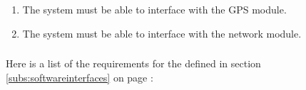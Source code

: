 \begin{enumerate} [resume*]

\item The system must be able to interface with the GPS module.

\item The system must be able to interface with the network module.



\end{enumerate} 


\subsubsection{} %
Here is a list of the requirements for the  defined in section \ref{subs:softwareinterfaces} on page \pageref{subs:softwareinterfaces}:




\subsubsection{} %


